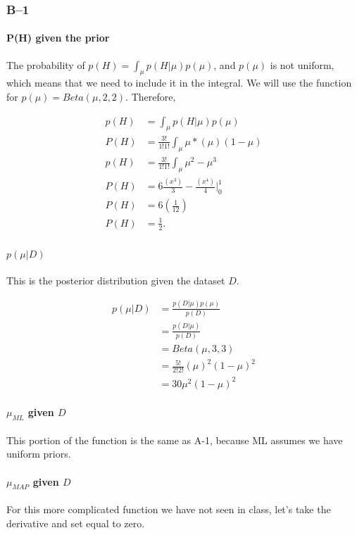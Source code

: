 \documentclass[paper=a4, fontsize=11pt]{scrartcl} %
\begin{document}
\subsubsection{B--1}
\paragraph{P(H) given the prior}
The probability of $p(H) = \int_{\mu} p(H|\mu)p(\mu)$, and $p(\mu)$ is not uniform, which means that we need to include it in the integral.  We will use the function for $p(\mu) =  Beta(\mu,2,2)$. Therefore, 

\begin{align}
p(H) &= \int_{\mu} p(H|\mu)p(\mu) \\
P(H) &= \frac{3!}{1!1!}\int_{\mu} \mu*(\mu)(1-\mu) \\
p(H) &=  \frac{3!}{1!1!} \int_{\mu} \mu^2-\mu^3 \\
P(H) &= 6 \frac{(x^3)}{3} - \frac{(x^4)}{4} |^1_0 \\
P(H) &= 6 (\frac{1}{12}) \\
P(H) &= \frac{1}{2}. \\
\end{align}

\paragraph{$p(\mu|D)$}
This is the posterior distribution given the dataset $D$.

\begin{align}
p(\mu|D) &= \frac{p(D|\mu)p(\mu)}{p(D)} \\
&= \frac{p(D|\mu)}{p(D)} \\
&= Beta(\mu,3,3) \\
&= \frac{5!}{2!2!}(\mu)^2(1-\mu)^2 \\
& = 30 \mu^2(1-\mu)^2
\end{align}

\paragraph{$\mu_{ML}$ given $D$}
This portion of the function is the same as A-1, because ML assumes we have uniform priors.

\paragraph{$\mu_{MAP}$ given $D$}
For this more complicated function we have not seen in class, let's take the derivative and set equal to zero.
\end{document}
